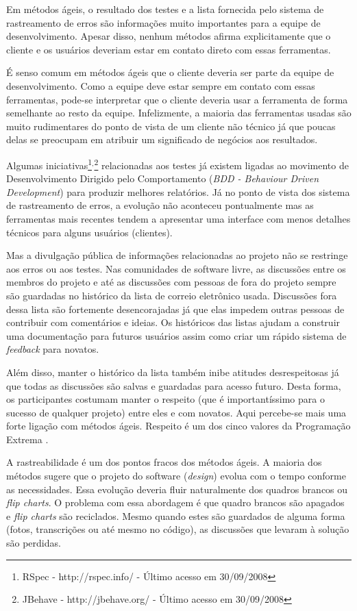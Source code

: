 Em métodos ágeis, o resultado dos testes e a lista fornecida pelo
sistema de rastreamento de erros são informações muito importantes
para a equipe de desenvolvimento. Apesar disso, nenhum métodos afirma
explicitamente que o cliente e os usuários deveriam estar em contato
direto com essas ferramentas.

É senso comum em métodos ágeis que o cliente deveria ser parte da
equipe de desenvolvimento. Como a equipe deve estar sempre em contato
com essas ferramentas, pode-se interpretar que o cliente deveria usar
a ferramenta de forma semelhante ao resto da equipe. Infelizmente, a
maioria das ferramentas usadas são muito rudimentares do ponto de
vista de um cliente não técnico já que poucas delas se preocupam em
atribuir um significado de negócios aos resultados.

Algumas iniciativas\footnote{RSpec - http://rspec.info/ - Último
  acesso em 30/09/2008}$^{, }$\footnote{JBehave - http://jbehave.org/
  - Último acesso em 30/09/2008} relacionadas aos testes já existem
ligadas ao movimento de Desenvolvimento Dirigido pelo Comportamento
(\emph{BDD - Behaviour Driven Development}) \cite{North2006} para
produzir melhores relatórios. Já no ponto de vista dos sistema de
rastreamento de erros, a evolução não aconteceu pontualmente mas as
ferramentas mais recentes tendem a apresentar uma interface com menos
detalhes técnicos para alguns usuários (clientes).

Mas a divulgação pública de informações relacionadas ao projeto não se
restringe aos erros ou aos testes. Nas comunidades de software livre,
as discussões entre os membros do projeto e até as discussões com
pessoas de fora do projeto sempre são guardadas no histórico da lista
de correio eletrônico usada. Discussões fora dessa lista são
fortemente desencorajadas já que elas impedem outras pessoas de
contribuir com comentários e ideias. Os históricos das listas ajudam a
construir uma documentação para futuros usuários assim como criar um
rápido sistema de \emph{feedback} para novatos.

Além disso, manter o histórico da lista também inibe atitudes
desrespeitosas já que todas as discussões são salvas e guardadas para
acesso futuro. Desta forma, os participantes costumam manter o
respeito (que é importantíssimo para o sucesso de qualquer projeto)
entre eles e com novatos. Aqui percebe-se mais uma forte ligação com
métodos ágeis. Respeito é um dos cinco valores da Programação Extrema
\cite{XP01}.

A rastreabilidade é um dos pontos fracos dos métodos ágeis. A maioria
dos métodos sugere que o projeto do software (\emph{design}) evolua
com o tempo conforme as necessidades. Essa evolução deveria fluir
naturalmente dos quadros brancos ou \emph{flip charts}. O problema com
essa abordagem é que quadro brancos são apagados e \emph{flip charts}
são reciclados.  Mesmo quando estes são guardados de alguma forma
(fotos, transcrições ou até mesmo no código), as discussões que
levaram à solução são perdidas.

